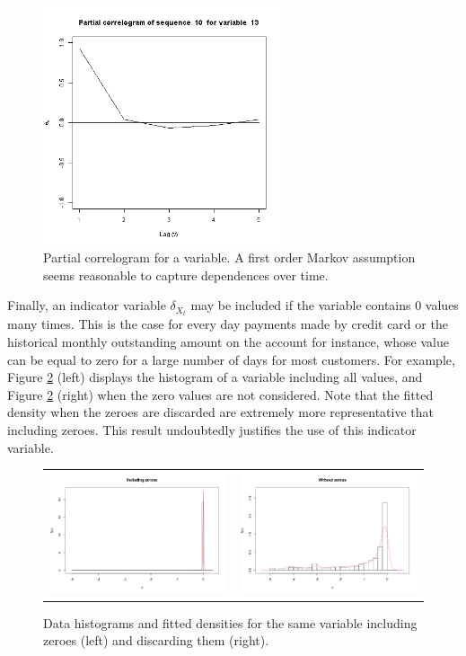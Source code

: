 \begin{figure}[htbp]
  \centering
    \includegraphics[width=70mm]{figures/CajamarPartialCorrelogram1}
    \caption{\label{fig:CajamarPartialCorrelograms}Partial correlogram for a variable. A first order Markov assumption seems reasonable to capture dependences over time.}
\end{figure}


Finally, an indicator variable $\delta_{X_t}$ may be included if the variable contains 0 values many times. This is the case for every day payments made by credit card or the historical monthly outstanding amount on the account for instance, whose value can be equal to zero for a large number of days for most customers. For example, Figure \ref{fig:CajamarZeroes} (left) displays the histogram of a variable including all values, and Figure \ref{fig:CajamarZeroes} (right) when the zero values are not considered. Note that the fitted density when the zeroes are discarded are extremely more representative that including zeroes. This result undoubtedly justifies the use of this indicator variable.

\begin{figure}[h]
  \centering
    \begin{tabular}{cc}    
       \includegraphics[width=70mm]{figures/with_zeroes}&
       \includegraphics[width=70mm]{figures/without_zeroes}
    \end{tabular}
    \caption{\label{fig:CajamarZeroes}Data histograms and fitted densities for the same variable including zeroes (left) and discarding them (right).}
\end{figure}

